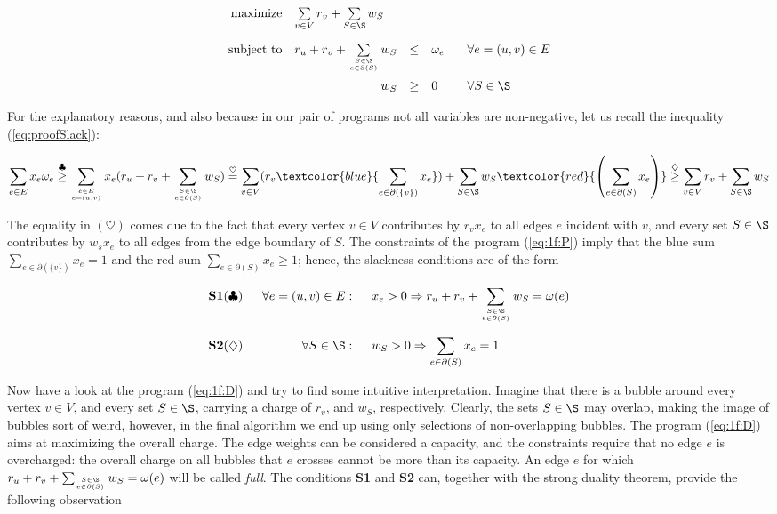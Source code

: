 \begin{equation}
  \label{eq:1f:D}
\begin{array}{rrcll}
  {\rm maximize}     & \multicolumn{1}{l}{\sum\limits_{v\in V}r_v + \sum\limits_{S\in\S}w_S}\\[4ex]
  {\rm subject\ to} & 
        r_u + r_v + \sum\limits_{S\in\S\atop e\in\partial(S)} w_S &\le&\omega_e& \;\;\;\forall e=(u,v)\in E\\[4ex]
                          & w_S&\ge&0& \;\;\;\forall S\in\S\\
\end{array}
\end{equation}

\noindent
For the explanatory reasons, and also because in our pair of programs not all variables are non-negative,
let us recall the inequality  (\ref{eq:proofSlack}):

$$
\sum_{e\in E}x_e\omega_e
\stackrel{\clubsuit}{\ge}
\sum_{e\in E\atop e=(u,v)}x_e(r_u+r_v+\sum_{S\in\S\atop e\in\partial(S)}w_S)
\stackrel{\heartsuit}{=}
\sum_{v\in V}(r_v  \textcolor{blue}{\sum_{e\in\partial(\{v\})}x_e} )   + \sum_{S\in\S}w_S
\textcolor{red}{\left(\sum_{e\in\partial(S)}x_e\right)}
\stackrel{\diamondsuit}{\ge}
\sum_{v\in V}r_v+\sum_{S\in\S}w_S
$$


\noindent
The equality in $(\heartsuit)$ comes due to the fact that every vertex $v\in V$
contributes by $r_vx_e$ to all edges $e$ incident with $v$, and every set $S\in\S$ 
contributes by $w_sx_e$ to all edges from the edge boundary of $S$. The constraints of the program 
(\ref{eq:1f:P}) imply that the blue sum $\sum_{e\in\partial(\{v\})}x_e=1$ and 
the red sum $\sum_{e\in\partial(S)}x_e\ge1$; hence, the slackness conditions are of the form


$$\begin{array}{lrl}
  {\bf S1} (\clubsuit) \;\;&\forall e=(u,v)\in E:\;\;&x_e>0\Rightarrow r_u + r_v +
  \displaystyle\sum\limits_{S\in\S\atop e\in\partial(S)}w_S=\omega(e)\\[6ex]
  {\bf S2} (\diamondsuit)\;\;&\forall S\in\S:\;\; & w_S>0\Rightarrow \displaystyle\sum\limits_{e\in\partial(S)}x_e=1
\end{array}$$


\noindent
Now have a look at the program (\ref{eq:1f:D}) and try to find some intuitive interpretation. Imagine that there is a 
bubble around every vertex $v\in V$, and every set $S\in\S$, carrying a charge of $r_v$, and $w_S$, respectively.
Clearly, the sets $S\in\S$ may overlap, making the image of bubbles sort of weird, however, in the final algorithm
we end up using only selections of non-overlapping bubbles. The program (\ref{eq:1f:D}) aims at maximizing
the overall charge. The edge weights can be considered a capacity, and the constraints require that no edge $e$
is overcharged: the overall charge on all bubbles that $e$ crosses cannot be more than its capacity.
An edge $e$ for which  $ r_u + r_v + \sum_{S\in\S\atop e\in\partial(S)}w_S=\omega(e)$ will be called {\em full}.
The conditions  {\bf S1} and {\bf S2} can, together with the strong duality theorem, provide the following 
observation

